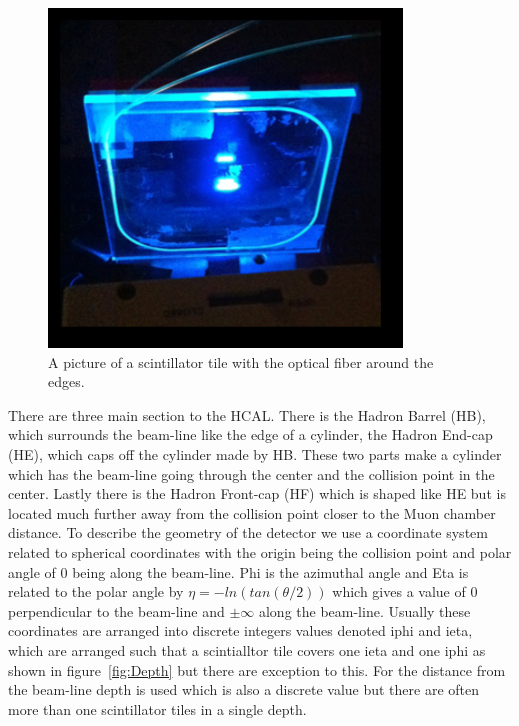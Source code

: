 \begin{figure}
\centering
\includegraphics[width=\linewidth]{Tile.png}
\caption{A picture of a scintillator tile with the optical fiber around the edges.}
\label{fig:Tile}
\end{figure}

There are three main section to the HCAL. There is the Hadron Barrel (HB), which surrounds the beam-line like the edge of a cylinder, the Hadron End-cap (HE), which caps off the cylinder made by HB. These two parts make a cylinder which has the beam-line going through the center and the collision point in the center. Lastly there is the Hadron Front-cap (HF) which is shaped like HE but is located much further away from the collision point closer to the Muon chamber distance. To describe the geometry of the detector we use a coordinate system related to spherical coordinates with the origin being the collision point and polar angle of 0 being along the beam-line. Phi is the azimuthal angle and Eta is related to the polar angle by $\eta = -ln(tan(\theta/2))$ which gives a value of 0 perpendicular to the beam-line and $\pm\infty$ along the beam-line. Usually these coordinates are arranged into discrete integers values denoted iphi and ieta, which are arranged such that a scintialltor tile covers one ieta and one iphi as shown in figure~\ref{fig:Depth} but there are exception to this. For the distance from the beam-line depth is used which is also a discrete value but there are often more than one scintillator tiles in a single depth. 


